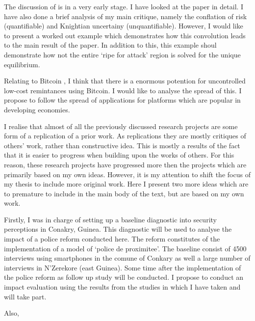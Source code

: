 \documentclass[a4paper]{report}\usepackage{graphicx, color}
\begin{document}
\begin{refsection}
The discussion of \textcite{morris1998unique} is in a very early stage. I have looked at the paper in detail. I have also done a brief analysis of my main critique, namely the conflation of risk (quantifiable) and Knightian uncertainy (unquantifiable). However, I would like to present a worked out example which demonstrates how this convolution leads to the main result of the paper. In addition to this, this example shoul demonstrate how not the entire `ripe for attack' region is solved for the unique equilibrium.

Relating to Bitcoin \parencite{nakamoto2008bitcoin}, I think that there is a enormous potention for uncontrolled low-cost remintances using Bitcoin. I would like to analyse the spread of this. I propose to follow the spread of applications for platforms which are popular in developing economies.

I realise that almost of all the previously discussed research projects are some form of a replication of a prior work. As replications they are mostly critiques of others' work, rather than constructive idea. This is mostly a results of the fact that it is easier to progress when building upon the works of others. For this reason, these research projects have progressed more then the projects which are primarily based on my own ideas. However, it is my attention to shift the focus of my thesis to include more original work. Here I present two more ideas which are to premature to include in the main body of the text, but are based on my own work.

Firstly, I was in charge of setting up a baseline diagnostic into security perceptions in Conakry, Guinea. This diagnostic will be used to analyse the impact of a police reform conducted here. The reform constitutes of the implementation of a model of `police de proximitee'. The baseline consist of 4500 interviews using smartphones in the comune of Conkary as well a large number of interviews in N'Zerekore (east Guinea). Some time after the implementation of the police reform as follow up study will be conducted. I propose to conduct an impact evaluation using the results from the studies in which I have taken and will take part.

Also, \parencite{taleb2010black, sornette2009dragon} 

\printbibliography
\end{refsection}
\end{document}
